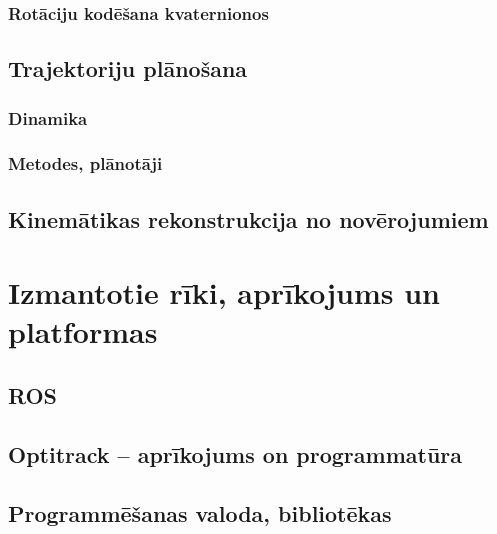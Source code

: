 \documentclass[12pt, a4paper]{article}
\numberwithin{equation}{section} %
\begin{document}
\subsubsection{Rotāciju kodēšana kvaternionos}

\subsection{Trajektoriju plānošana}

\subsubsection{Dinamika}

\subsubsection{Metodes, plānotāji}

\subsection{Kinemātikas rekonstrukcija no novērojumiem}


%
%
%
%
%
%
%
%
%
%
%
%
%
%
%
%
%
%
%

\newpage
\section{Izmantotie rīki, aprīkojums un platformas}

\subsection{ROS}

\subsection{Optitrack -- aprīkojums on programmatūra}

\subsection{Programmēšanas valoda, bibliotēkas}

%
%
%
%
%
%
%
%
%
%
%
%
%
%
%
%
%
%
%
\end{document}
